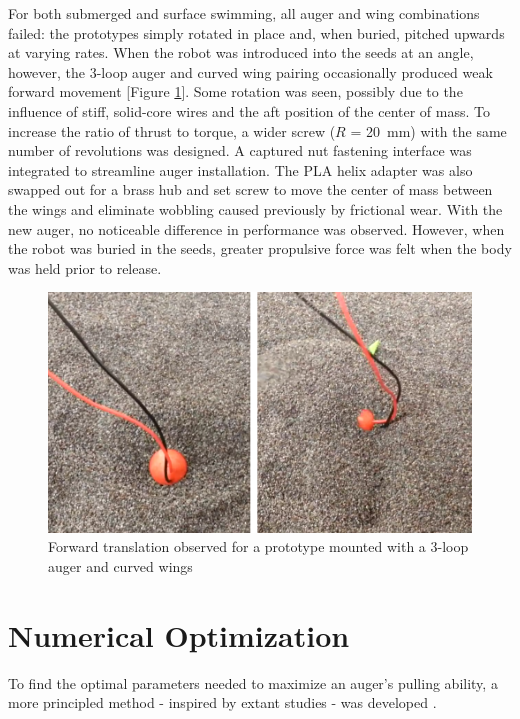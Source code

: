 \documentclass[letterpaper, 11 pt]{article}
\begin{document}
For both submerged and surface swimming, all auger and wing combinations failed: the prototypes simply rotated in place and, when buried, pitched upwards at varying rates. When the robot was introduced into the seeds at an angle, however, the 3-loop auger and curved wing pairing occasionally produced weak forward movement [Figure \ref{fig:t1_success}]. Some rotation was seen, possibly due to the influence of stiff, solid-core wires and the aft position of the center of mass. To increase the ratio of thrust to torque, a wider screw ($R$ = \SI{20}{\milli\m}) with the same number of revolutions was designed. A captured nut fastening interface was integrated to streamline auger installation. The PLA helix adapter was also swapped out for a brass hub and set screw to move the center of mass between the wings and eliminate wobbling caused previously by frictional wear. 
With the new auger, no noticeable difference in performance was observed. However, when the robot was buried in the seeds, greater propulsive force was felt when the body was held prior to release.   

\begin{figure}[H]
\centering
\includegraphics[width=0.7\linewidth]{./imgs/t1_success}
\caption{Forward translation observed for a prototype mounted with a 3-loop auger and curved wings}
\label{fig:t1_success}
\end{figure}

\section{Numerical Optimization}
To find the optimal parameters needed to maximize an auger's pulling ability, a more principled method - inspired by extant studies - was developed \cite{Melo,Li}.
\end{document}
